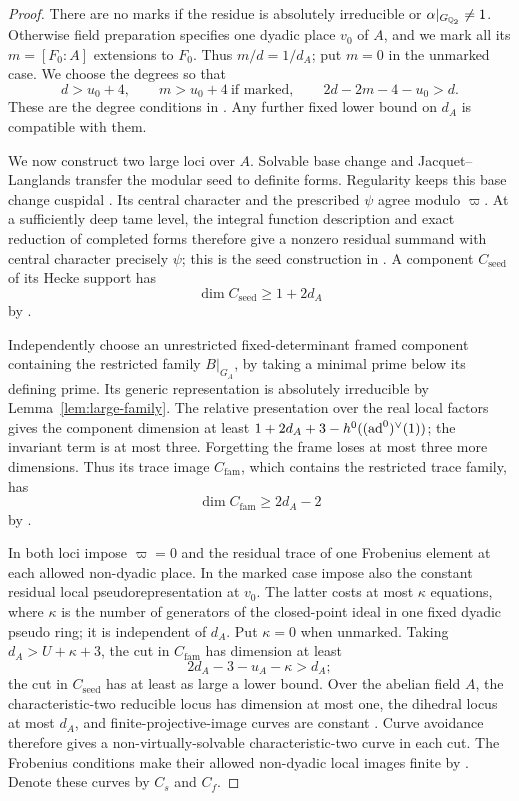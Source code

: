 \begin{proof}
There are no marks if the residue is absolutely irreducible or
$\alpha|_{G_{\mathbb Q_2}}\ne1$.  Otherwise field preparation specifies
one dyadic place $v_0$ of $A$, and we mark all its $m=[F_0:A]$
extensions to $F_0$.  Thus $m/d=1/d_A$; put $m=0$ in the unmarked
case.  We choose the degrees so that
\begin{equation}\label{eq:family-degrees}
 d>u_0+4,\qquad
 m>u_0+4\ \text{if marked},\qquad
 2d-2m-4-u_0>d.
\end{equation}
These are the degree conditions in \cite[Section~7.2]{FM2}.
Any further fixed lower bound on $d_A$ is compatible with them.

We now construct two large loci over $A$.  Solvable base change and
Jacquet--Langlands transfer the modular seed to definite forms.
Regularity keeps this base change cuspidal
\cite[Lemma~4.6]{FM2}.  Its central character and the prescribed
$\psi$ agree modulo $\varpi$.  At a sufficiently deep tame level,
the integral function description and exact reduction of completed
forms therefore give a nonzero residual summand with central
character precisely $\psi$; this is the seed construction in
\cite[Section~7.4]{FM2}.  A component $C_{\mathrm{seed}}$ of its
Hecke support has
\[
 \dim C_{\mathrm{seed}}\ge1+2d_A
\]
by \cite[Proposition~4.4]{FM2}.

Independently choose an unrestricted fixed-determinant framed
component containing the restricted family $B|_{G_A}$, by taking a
minimal prime below its defining prime.  Its generic representation
is absolutely irreducible by Lemma~\ref{lem:large-family}.
The relative presentation over the real local factors gives the
component dimension at least
$1+2d_A+3-h^0((\operatorname{ad}^0)^\vee(1))$; the invariant term is at most three.
Forgetting the frame loses at most three more dimensions.
Thus its trace image $C_{\mathrm{fam}}$, which contains the
restricted trace family, has
\[
 \dim C_{\mathrm{fam}}\ge2d_A-2
\]
by \cite[Proposition~3.6, Lemma~3.2, and Section~7.4]{FM2}.

In both loci impose $\varpi=0$ and the residual trace of one
Frobenius element at each allowed non-dyadic place.  In the marked
case impose also the constant residual local pseudorepresentation
at $v_0$.  The latter costs at most $\kappa$ equations, where
$\kappa$ is the number of generators of the closed-point ideal in
one fixed dyadic pseudo ring; it is independent of $d_A$.  Put
$\kappa=0$ when unmarked.  Taking
$d_A>U+\kappa+3$, the cut in $C_{\mathrm{fam}}$ has dimension at
least
\[
 2d_A-3-u_A-\kappa>d_A;
\]
the cut in $C_{\mathrm{seed}}$ has at least as large a lower bound.
Over the abelian field $A$, the characteristic-two reducible locus
has dimension at most one, the dihedral locus at most $d_A$, and
finite-projective-image curves are constant
\cite[Lemma~3.8]{FM2}.  Curve avoidance
\cite[Lemma~3.3(1)]{FM2} therefore gives a
non-virtually-solvable characteristic-two curve in each cut.
The Frobenius conditions make their allowed non-dyadic local images
finite by \cite[Lemma~3.9]{FM2}.  Denote these curves by
$C_s$ and $C_f$.


\end{proof}
